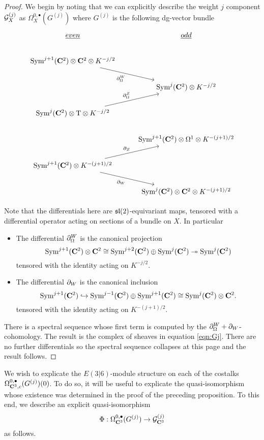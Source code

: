 \documentclass[../main.tex]{subfiles}
\begin{document}
\begin{proof}
We begin by noting that we can explicitly describe the weight $j$ component $\mathcal{G}^{(j)}_{X}$ as $\Omega^{0,\bullet}_{X} (G^{(j)})$ where $G^{(j)}$ is the following dg-vector bundle
\begin{equation}
\begin{tikzcd}
\ul{even} & \ul{odd} \\
\Sym^{j+1}(\C^2) \otimes \C^2 \ar[dr, "\del^W_\Omega"'] \otimes K^{-j/2}\\ 
& \Sym^j (\C^2) \otimes K^{-j/2} \\ 
\Sym^j (\C^2) \otimes  \T \otimes K^{-j/2} \ar[ur, "\del^Z_\Omega"]  & \\
& \Sym^{j+1}(\C^2)  \otimes  \Omega^1 \otimes K^{-(j+1)/2} \\ 
\Sym^{j+1}(\C^2) \otimes K^{-(j+1)/2} \ar[ur, "\del_Z"] \ar[dr, "\del_W"'] \\
& \Sym^j(\C^2) \otimes \C^2\otimes K^{-(j+1)/2} 
\end{tikzcd}
\end{equation}

Note that the differentials here are $\mathfrak{sl}(2)$-equivariant maps, tensored with a differential operator acting on sections of a bundle on $X$. In particular

\begin{itemize}
\item The differential $\partial^W_\Omega$ is the canonical projection \[\text{Sym}^{j+1}(\mathbf{C}^2) \otimes \mathbf{C}^2 \cong \text{Sym}^{j+2} (\mathbf{C}^2) \oplus \text{Sym} ^j (\mathbf{C}^2) \twoheadrightarrow \text{Sym}^j (\mathbf{C}^2)\] tensored with the identity acting on $K^{-j/2}$. 

\item The differential $\partial_W$ is the canonical inclusion \[\text{Sym}^{j+1}(\mathbf{C}^2) \hookrightarrow \text{Sym}^{j-1}(\mathbf{C}^2) \oplus \text{Sym}^{j+1}(\mathbf{C}^2) \cong \text{Sym}^j(\mathbf{C}^2) \otimes \mathbf{C}^2 .\] tensored with the identity acting on $K^{-(j+1)/2}$.
\end{itemize}

There is a spectral sequence whose first term is computed by the $\partial^W_\Omega +\partial_W$-cohomology. The result is the complex of sheaves in equation \ref{eqn:Gj}. There are no further differentials so the spectral sequence collapses at this page and the result follows.
\end{proof}

\iffalse
\parsec[]
We wish to explicate the $E(3|6)$-module structure on each of the costalks $\Omega^{0,\bullet}_{\mathbf{C}^3, c} (G^{(j)} )(0)$. To do so, it will be useful to explicate the quasi-isomorphism whose existence was determined in the proof of the preceding proposition. To this end, we describe an explicit quasi-isomorphism 
\[\Phi: \Omega^{0,\bullet}_{\mathbf{C}^3} (G^{(j)} ) \to \mathcal{G}^{(j)}_{\mathbf{C}^3}\] 
as follows. 
\end{document}
